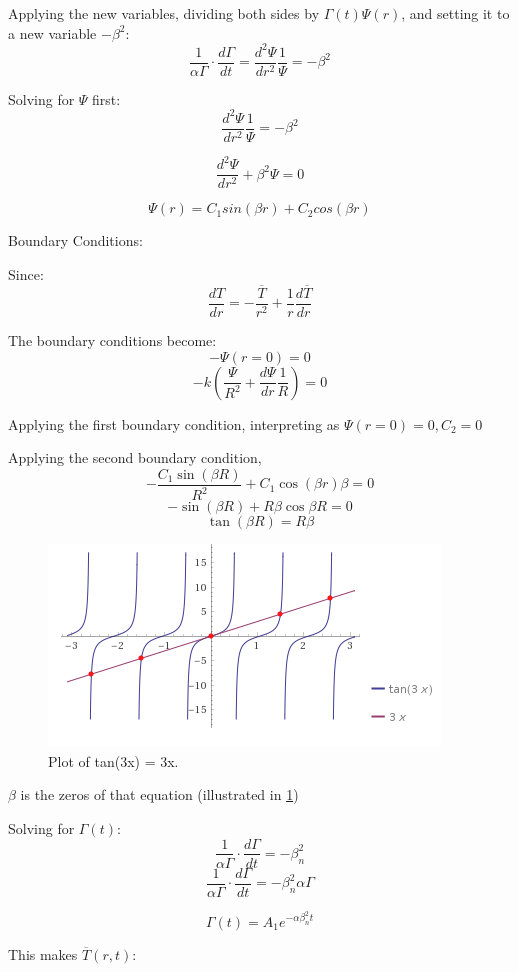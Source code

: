 \documentclass[12pt,letterpaper]{article}
\begin{document}
{Applying the new variables, dividing both sides by $\Gamma (t) \Psi (r) $,
and setting it to a new variable $ -\beta^2 $:
\[\frac{1}{\alpha  \Gamma} \cdot \frac{d\Gamma}{dt} = \frac{d^2 \Psi}{dr^2} \frac{1}{\Psi} = -\beta^2 \] 

Solving for $\Psi$ first:
\[\frac{d^2 \Psi}{dr^2} \frac{1}{\Psi} = -\beta^2 \]

\[\frac{d^2 \Psi}{dr^2} + \beta^2 \Psi = 0 \]

\[\Psi (r) = C_1 sin(\beta r) + C_2 cos(\beta r) \]

Boundary Conditions:

Since:
\[\frac{dT}{dr} = -\frac{\overline{T}}{r^2} + \frac{1}{r} \frac{d\overline{T}}{dr}\]

The boundary conditions become:
\[-\Psi(r=0) = 0 \]
\[-k (\frac{\Psi}{R^2} + \frac{d\Psi}{dr} \frac{1}{R}) = 0  \]

Applying the first boundary condition,
interpreting as $\Psi(r=0) = 0 , C_2 = 0$

Applying the second boundary condition,
\[-\frac{C_1 \sin(\beta R)}{R^2} + C_1 \cos(\beta r) \beta = 0 \]
\[-\sin(\beta R) + R \beta \cos{\beta R} =0 \]
\[\tan(\beta R ) = R\beta \]


\begin{figure}[htbp!]
  \begin{center}
    \includegraphics[scale=0.7]{tan_plot.png}
  \end{center}
  \caption{Plot of tan(3x) = 3x.}
  \label{fig:tan_plot}
\end{figure}

$\beta$ is the zeros of that equation (illustrated in \cref{fig:tan_plot})

Solving for $\Gamma(t)$:
\[\frac{1}{\alpha  \Gamma} \cdot \frac{d\Gamma}{dt} = -\beta_n^2 \]
\[\frac{1}{\alpha  \Gamma} \cdot \frac{d\Gamma}{dt} = -\beta_n^2 \alpha \Gamma \]

\[\Gamma(t) = A_1 e^{-\alpha \beta_n^2 t }\]

This makes $\overline{T}(r,t)$:

}
\end{document}
